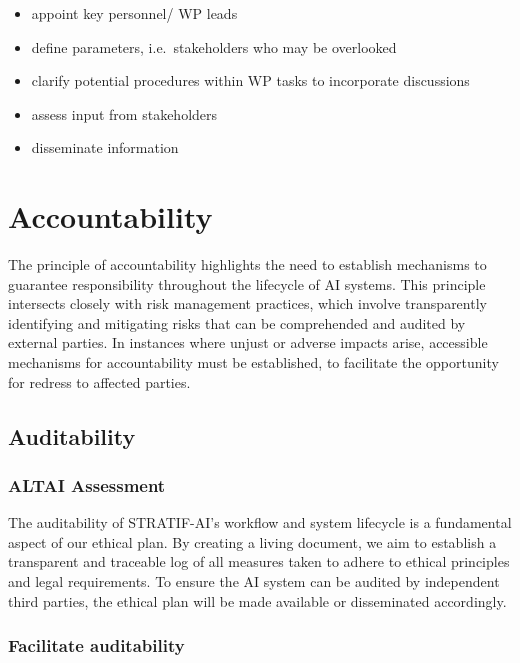 \documentclass[
  letterpaper,
  DIV=11,
  numbers=noendperiod]{scrreport}
\providecommand{\tightlist}{%
  \setlength{\itemsep}{0pt}\setlength{\parskip}{0pt}}\usepackage{longtable,booktabs,array}
\begin{document}
\begin{itemize}
\tightlist
\item
  appoint key personnel/ WP leads
\item
  define parameters, i.e.~stakeholders who may be overlooked
\item
  clarify potential procedures within WP tasks to incorporate
  discussions
\item
  assess input from stakeholders
\item
  disseminate information
\end{itemize}


\hypertarget{accountability}{%
\chapter{Accountability}\label{accountability}}

The principle of accountability highlights the need to establish
mechanisms to guarantee responsibility throughout the lifecycle of AI
systems. This principle intersects closely with risk management
practices, which involve transparently identifying and mitigating risks
that can be comprehended and audited by external parties. In instances
where unjust or adverse impacts arise, accessible mechanisms for
accountability must be established, to facilitate the opportunity for
redress to affected parties.

\hypertarget{auditability}{%
\section{Auditability}\label{auditability}}

\hypertarget{altai-assessment-16}{%
\subsection*{ALTAI Assessment}\label{altai-assessment-16}}

The auditability of STRATIF-AI's workflow and system lifecycle is a
fundamental aspect of our ethical plan. By creating a living document,
we aim to establish a transparent and traceable log of all measures
taken to adhere to ethical principles and legal requirements. To ensure
the AI system can be audited by independent third parties, the ethical
plan will be made available or disseminated accordingly.

\hypertarget{facilitate-auditability}{%
\subsection{Facilitate auditability}\label{facilitate-auditability}}
\end{document}
